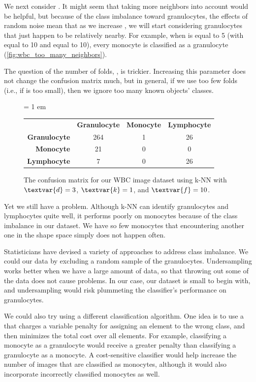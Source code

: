 We next consider . It might seem that taking more neighbors into account would be helpful, but because of the class imbalance toward granulocytes, the effects of random noise mean that as we increase , we will start considering granulocytes that just happen to be relatively nearby. For example, when  is equal to 5 (with  equal to 10 and  equal to 10), every monocyte is classified as a granulocyte (\autoref{fig:wbc_too_many_neighbors}).

The question of the number of folds, , is trickier. Increasing this parameter does not change the confusion matrix much, but in general, if we use too few folds (i.e., if  is too small), then we ignore too many known objects' classes.\\

\begin{figure}[h]
\centering
\tabcolsep = 1 em
\mySfFamily
{}
\begin{tabular}{r c c c}
\rowcolor{gray!50}
& \textbf{Granulocyte} & \textbf{Monocyte} & \textbf{Lymphocyte} \\
\textbf{Granulocyte} & 264 & 1 & 26 \\
\textbf{Monocyte} & \phantom{5}21 & 0 & \phantom{5}0 \\
\textbf{Lymphocyte} & \phantom{55}7 & 0 & 26
\end{tabular}
\caption{The confusion matrix for our WBC image dataset using k-NN with $\textvar{d} = \text{3}$, $\textvar{k} = \text{1}$, and $\textvar{f} = \text{10}$.}
\label{fig:wbc_too_many_neighbors}
\end{figure}

Yet we still have a problem. Although k-NN can identify granulocytes and lymphocytes quite well, it performs poorly on monocytes because of the class imbalance in our dataset. We have so few monocytes that encountering another one in the shape space simply does not happen often.

Statisticians have devised a variety of approaches to address class imbalance. We could  our data by excluding a random sample of the granulocytes. Undersampling works better when we have a large amount of data, so that throwing out some of the data does not cause problems. In our case, our dataset is small to begin with, and undersampling would risk plummeting the classifier's performance on granulocytes.

We could also try using a different classification algorithm. One idea is to use a  that charges a variable penalty for assigning an element to the wrong class, and then minimizes the total cost over all elements. For example, classifying a monocyte as a granulocyte would receive a greater penalty than classifying a granulocyte as a monocyte. A cost-sensitive classifier would help increase the number of images that are classified as monocytes, although it would also incorporate incorrectly classified monocytes as well.

